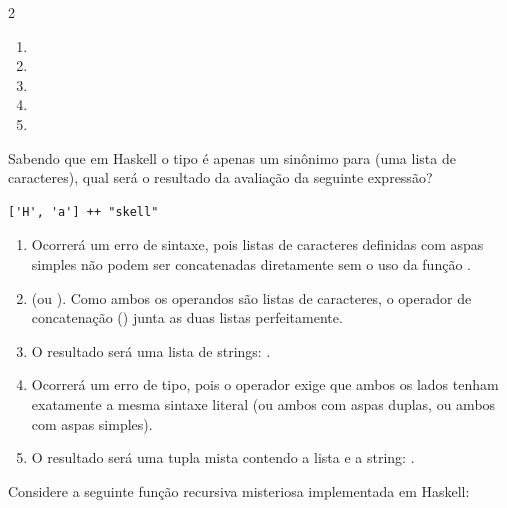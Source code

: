 \documentclass[a4paper,10pt,brazil]{article}
\begin{document}
\begin{multicols}{2}
\begin{enumerate}
  \item {}

  \item {}

  \item {}

  \item {}
  \item {}


\end{enumerate}

Sabendo que em Haskell o tipo  é apenas um sinônimo para \haskellinline{[Char]} (uma lista de caracteres), qual será o resultado da avaliação da seguinte expressão?
\begin{verbatim}
['H', 'a'] ++ "skell"
\end{verbatim}

\begin{enumerate}
  \item Ocorrerá um erro de sintaxe, pois listas de caracteres definidas com aspas simples não podem ser concatenadas diretamente sem o uso da função .

  \item {} (ou \haskellinline{['H', 'a', 's', 'k', 'e', 'l', 'l']}). Como ambos os operandos são listas de caracteres, o operador de concatenação (\haskellinline{++}) junta as duas listas perfeitamente.

  \item O resultado será uma lista de strings: \haskellinline{["Ha", "skell"]}.

  \item Ocorrerá um erro de tipo, pois o operador \haskellinline{++} exige que ambos os lados tenham exatamente a mesma sintaxe literal (ou ambos com aspas duplas, ou ambos com aspas simples).

  \item O resultado será uma tupla mista contendo a lista e a string: .


\end{enumerate}

Considere a seguinte função recursiva misteriosa implementada em Haskell:


\end{multicols}
\end{document}
